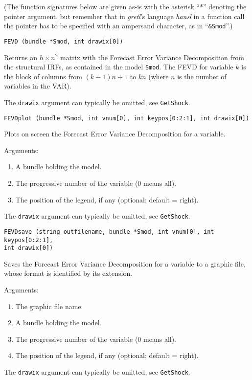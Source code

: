 \documentclass[a4paper,10pt]{article}
\newenvironment{funcdoc}[1]
{\noindent\hrulefill\newline\nopagebreak\texttt{#1}%
\nopagebreak\par\noindent\hrulefill%
\nopagebreak\par\nopagebreak\smallskip\nopagebreak\par}
{\bigskip}
\begin{document}
(The function signatures below are given as-is with the asterisk ``*'' denoting
the pointer argument, but remember that in \emph{gretl}'s language \emph{hansl} 
in a function call the pointer has to be 
specified with an ampersand character,  as in ``\verb|&Smod|''.)


\begin{funcdoc}{FEVD (bundle *Smod, int drawix[0])}
  \noindent Returns an $h \times n^2$ matrix with  
  the Forecast Error Variance Decomposition from the
  structural IRFs, as contained in the model \texttt{Smod}. 
  The FEVD for variable $k$ is the block of
  columns from $(k-1) n + 1$ to $k n$ (where $n$ is the number of
  variables in the VAR).
  
  The \texttt{drawix} argument can typically be omitted, see \texttt{GetShock}.
\end{funcdoc}

\begin{funcdoc}{FEVDplot (bundle *Smod, int vnum[0], int keypos[0:2:1], int drawix[0])}
  \noindent Plots on screen the Forecast Error Variance Decomposition for a
  variable. 
  
   \noindent Arguments:
  \begin{enumerate}
  \item A bundle holding the model.
  \item The progressive number of the variable (0 means all).
  \item The position of the legend, if any (optional; default = right).
  \end{enumerate}
  
  The \texttt{drawix} argument can typically be omitted, see \texttt{GetShock}.
\end{funcdoc}

\begin{funcdoc}{FEVDsave (string outfilename, bundle *Smod, int vnum[0], int keypos[0:2:1], \\
int drawix[0])}
  \noindent Saves the Forecast Error Variance Decomposition for a variable to a
  graphic file, whose format is identified by its extension. 
  
   \noindent Arguments:
   
  \begin{enumerate}
  \item The graphic file name.
  \item A bundle holding the model.
  \item The progressive number of the variable (0 means all).
  \item The position of the legend, if any (optional; default = right).
  \end{enumerate}
  
  The \texttt{drawix} argument can typically be omitted, see \texttt{GetShock}.
\end{funcdoc}
\end{document}

